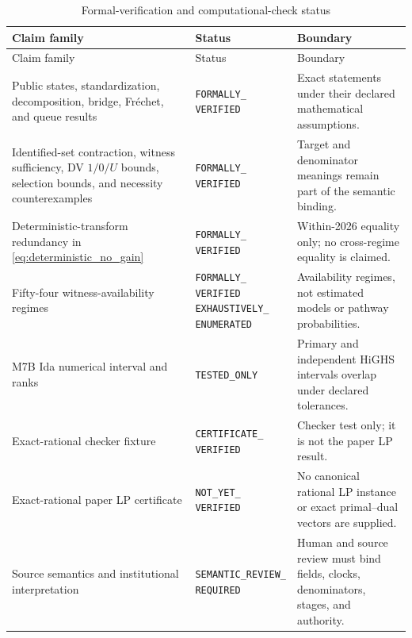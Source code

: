 \documentclass[11pt]{article}
\begin{document}
{\footnotesize
\begin{longtable}{@{}>{\raggedright\arraybackslash}p{}>{\raggedright\arraybackslash}p{}>{\raggedright\arraybackslash}p{}@{}}
\caption{Formal-verification and computational-check status}\label{tab:formalverification}\\
\toprule
Claim family & Status & Boundary \\
\midrule
\endfirsthead
\toprule
Claim family & Status & Boundary \\
\midrule
\endhead
Public states, standardization, decomposition, bridge, Fr\'echet, and queue results & \makecell[l]{\texttt{FORMALLY\_}\\\texttt{VERIFIED}} & Exact statements under their declared mathematical assumptions. \\
Identified-set contraction, witness sufficiency, DV $1/0/U$ bounds, selection bounds, and necessity counterexamples & \makecell[l]{\texttt{FORMALLY\_}\\\texttt{VERIFIED}} & Target and denominator meanings remain part of the semantic binding. \\
Deterministic-transform redundancy in \cref{eq:deterministic_no_gain} & \makecell[l]{\texttt{FORMALLY\_}\\\texttt{VERIFIED}} & Within-2026 equality only; no cross-regime equality is claimed. \\
Fifty-four witness-availability regimes & \makecell[l]{\texttt{FORMALLY\_}\\\texttt{VERIFIED}\\\texttt{EXHAUSTIVELY\_}\\\texttt{ENUMERATED}} & Availability regimes, not estimated models or pathway probabilities. \\
M7B Ida numerical interval and ranks & \texttt{TESTED\_ONLY} & Primary and independent HiGHS intervals overlap under declared tolerances. \\
Exact-rational checker fixture & \makecell[l]{\texttt{CERTIFICATE\_}\\\texttt{VERIFIED}} & Checker test only; it is not the paper LP result. \\
Exact-rational paper LP certificate & \makecell[l]{\texttt{NOT\_YET\_}\\\texttt{VERIFIED}} & No canonical rational LP instance or exact primal--dual vectors are supplied. \\
Source semantics and institutional interpretation & \makecell[l]{\texttt{SEMANTIC\_REVIEW\_}\\\texttt{REQUIRED}} & Human and source review must bind fields, clocks, denominators, stages, and authority. \\
\bottomrule
\end{longtable}
}
\end{document}
